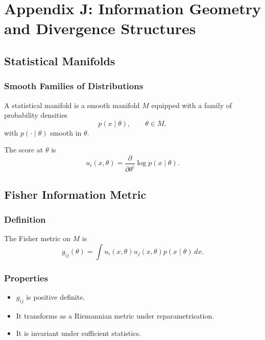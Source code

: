 \chapter*{Appendix J: Information Geometry and Divergence Structures}

\section{Statistical Manifolds}

\subsection{Smooth Families of Distributions}

A statistical manifold is a smooth manifold $M$ equipped with a family of probability densities
\[
p(x \mid \theta), \qquad \theta \in M,
\]
with $p(\cdot \mid \theta)$ smooth in $\theta$.

\begin{definition}
The score at $\theta$ is
\[
u_i(x,\theta) = \frac{\partial}{\partial \theta^i} \log p(x\mid\theta).
\]
\end{definition}

\section{Fisher Information Metric}

\subsection{Definition}

The Fisher metric on $M$ is
\[
g_{ij}(\theta)
  = \int u_i(x,\theta)u_j(x,\theta)p(x\mid\theta)\,dx.
\]

\subsection{Properties}

\begin{itemize}
\item $g_{ij}$ is positive definite.
\item It transforms as a Riemannian metric under reparametrisation.
\item It is invariant under sufficient statistics.
\end{itemize}

